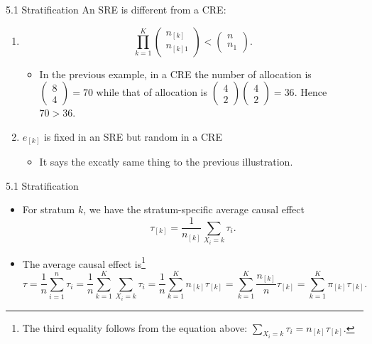 \documentclass[aspectratio=169, 12pt]{beamer}
\begin{document}
\begin{frame}{5.1 Stratification}
  An SRE is different from a CRE:
  \begin{enumerate}
    \item \[\prod_{k=1}^{K}\begin{pmatrix}
      n_{[k]}\\n_{[k]1}
    \end{pmatrix}<\begin{pmatrix}
      n\\n_1
    \end{pmatrix}.\]
    \begin{itemize}
      \item In the previous example, in a CRE the number of allocation is $\begin{pmatrix}
        8\\4
      \end{pmatrix}=70$ while that of allocation is $\begin{pmatrix}
        4\\2
      \end{pmatrix}\begin{pmatrix}
        4\\2
      \end{pmatrix}=36$. Hence $70>36.$
    \end{itemize}
    \item $e_{[k]}$ is fixed in an SRE but random in a CRE
    \begin{itemize}
      \item It says the excatly same thing to the previous illustration.
    \end{itemize}
  \end{enumerate}
\end{frame}

\begin{frame}{5.1 Stratification}
  \begin{itemize}
    \item For stratum $k$, we have the stratum-specific average causal effect
    \[
    \tau_{[k]} = \frac{1}{n_{[k]}}\sum_{X_i=k}^{}\tau_i.
    \]
    \item The average causal effect is\footnote{The third equality follows from the equation above: $\sum_{X_i=k}^{}\tau_i=n_{[k]}\tau_{[k]}$.}
    \[
    \tau = \frac{1}{n}\sum_{i=1}^{n}\tau_i = \frac{1}{n}\sum_{k=1}^{K}\sum_{X_i=k}^{}\tau_i=\frac{1}{n}\sum_{k=1}^{K}n_{[k]}\tau_{[k]}=\sum_{k=1}^{K}\frac{n_{[k]}}{n}\tau_{[k]}=\sum_{k=1}^{K}\pi_{[k]}\tau_{[k]}.
    \]
  \end{itemize}
\end{frame}
\end{document}
